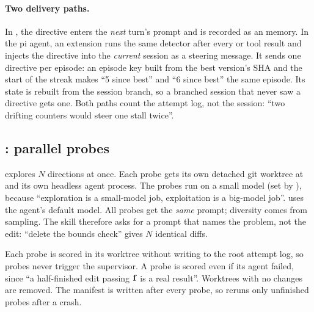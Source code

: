 \paragraph{Two delivery paths.} In , the directive enters the \emph{next} turn's prompt and
is recorded as an  memory. In the pi agent, an extension runs the same detector
after every  or  tool result and injects the directive into the
\emph{current} session as a steering message. It sends one directive per episode: an episode key
built from the best version's SHA and the start of the streak makes ``5 since best'' and ``6 since
best'' the same episode. Its state is rebuilt from the session branch, so a branched session that
never saw a directive gets one. Both paths count the attempt log, not the session: ``two drifting
counters would steer one stall twice''.

\subsection{\texorpdfstring{}{avo fan}: parallel probes}
\label{sec:fan}

 explores $N$ directions at once. Each probe gets its own detached git worktree at
 and its own headless agent process. The probes run on a small model (set by
), because ``exploration is a small-model job, exploitation is a big-model
job''.  uses the agent's default model. All probes get the \emph{same} prompt; diversity
comes from sampling. The skill therefore asks for a prompt that names the problem, not the edit:
``delete the bounds check'' gives $N$ identical diffs.

Each probe is scored in its worktree without writing to the root attempt log, so probes never
trigger the supervisor. A probe is scored even if its agent failed, since ``a half-finished edit
passing $\mathbf{f}$ is a real result''. Worktrees with no changes are removed. The manifest is written after
every probe, so  reruns only unfinished probes after a crash.

